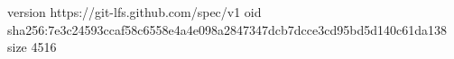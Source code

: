 version https://git-lfs.github.com/spec/v1
oid sha256:7e3c24593ccaf58c6558e4a4e098a2847347dcb7dcce3cd95bd5d140c61da138
size 4516
